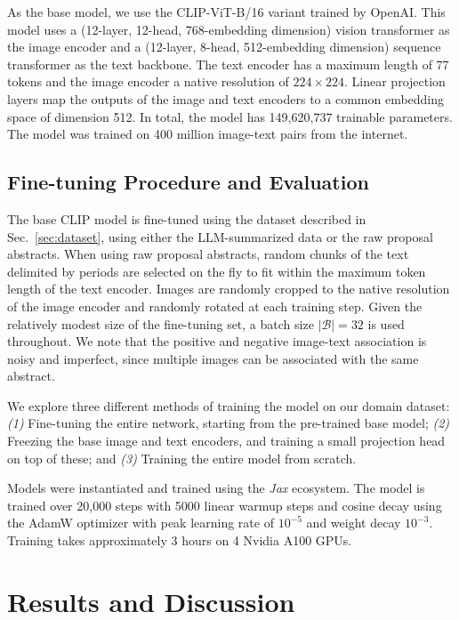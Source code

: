 \documentclass[10pt]{article} %
\newcommand{\package}[1]{\textsl{#1}\xspace}
\begin{document}
As the base model, we use the CLIP-ViT-B/16 \citep{radford2021learning} variant trained by OpenAI. This model uses a (12-layer, 12-head, 768-embedding dimension) vision transformer as the image encoder and a (12-layer, 8-head, 512-embedding dimension) sequence transformer as the text backbone. The text encoder has a maximum length of 77 tokens and the image encoder a native resolution of $224\times224$. Linear projection layers map the outputs of the image and text encoders to a common embedding space of dimension 512. In total, the model has 149,620,737 trainable parameters. The model was trained on 400 million image-text pairs from the internet. 

\subsection{Fine-tuning Procedure and Evaluation}
\label{sec:finetuning}

The base CLIP model is fine-tuned using the dataset described in Sec.~\ref{sec:dataset}, using either the LLM-summarized data or the raw proposal abstracts. When using raw proposal abstracts, random chunks of the text delimited by periods are selected on the fly to fit within the maximum token length of the text encoder. Images are randomly cropped to the native resolution of the image encoder and randomly rotated at each training step. Given the relatively modest size of the fine-tuning set, a batch size $|\mathcal B| = 32$ is used throughout. We note that the positive and negative image-text association is noisy and imperfect, since multiple images can be associated with the same abstract.

We explore three different methods of training the model on our domain dataset: \emph{(1)} Fine-tuning the entire network, starting from the pre-trained base model; \emph{(2)} Freezing the base image and text encoders, and training a small projection head on top of these; and \emph{(3)} Training the entire model from scratch.

Models were instantiated and trained using the \package{Jax} \citep{jax2018github} ecosystem. The model is trained over 20,000 steps with 5000 linear warmup steps and cosine decay using the AdamW optimizer \citep{DBLP:conf/iclr/LoshchilovH19,DBLP:journals/corr/KingmaB14} with peak learning rate of $10^{-5}$ and weight decay $10^{-3}$. Training takes approximately 3 hours on 4 Nvidia A100 GPUs.


\section{Results and Discussion}
\label{sec:results}
\end{document}
